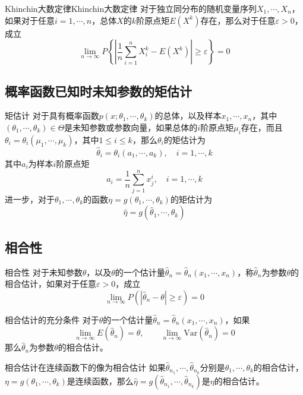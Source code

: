 \documentclass[lang = cn, scheme = chinese, thmcnt = section]{elegantbook}
\begin{document}
\begin{theorem}{Khinchin大数定律}{Khinchin大数定律}
	对于独立同分布的随机变量序列$X_1,\cdots,X_n$，如果对于任意$i=1,\cdots,n$，总体$X$的$k$阶原点矩$E(X^k)$存在，那么对于任意$\varepsilon>0$，成立
	$$
	\lim_{n\to\infty}P\left\{ \left| \frac{1}{n}\sum_{i=1}^{n}{X_i^k}-E(X^k) \right|\ge\varepsilon \right\}=0
	$$
\end{theorem}

\subsection{概率函数已知时未知参数的矩估计}

\begin{definition}{矩估计}
	对于具有概率函数$p(x;\theta_1,\cdots,\theta_k)$的总体，以及样本$x_1,\cdots,x_n$，其中$(\theta_1,\cdots,\theta_k)\in\Theta$是未知参数或参数向量，如果总体的$i$阶原点矩$\mu_i$存在，而且$\theta_i=\theta_i(\mu_1,\cdots,\mu_k)$，其中$1\le i\le k$，那么$\theta_i$的矩估计为
	$$
	\hat{\theta}_i=\theta_i(a_1,\cdots,a_k),\quad i=1,\cdots,k
	$$
	其中$a_i$为样本$i$阶原点矩
	$$
	a_i=\frac{1}{n}\sum_{j=1}^{n}{x_j^i},\quad i=1,\cdots,k
	$$
	进一步，对于$\theta_1,\cdots,\theta_k$的函数$\eta=g(\theta_1,\cdots,\theta_k)$的矩估计为
	$$
	\hat{\eta}=g(\hat{\theta}_1,\cdots,\hat{\theta}_k)
	$$
\end{definition}

\subsection{相合性}

\begin{definition}{相合性}
	对于未知参数$\theta$，以及$\theta$的一个估计量$\hat{\theta}_n=\hat{\theta}_n(x_1,\cdots,x_n)$，称$\hat{\theta}_n$为参数$\theta$的相合估计，如果对于任意$\varepsilon>0$，成立
	$$
	\lim_{n\to\infty}{P\left( \left|\hat{\theta}_n-\theta\right|\ge\varepsilon \right)}=0
	$$
\end{definition}

\begin{theorem}{相合估计的充分条件}
	对于$\theta$的一个估计量$\hat{\theta}_n=\hat{\theta}_n(x_1,\cdots,x_n)$，如果
	$$
	\lim_{n\to\infty}{E( \hat{\theta}_n)}=\theta,\qquad
	\lim_{n\to\infty}{\mathrm{Var}( \hat{\theta}_n)}=0
	$$
	那么$\hat{\theta}_n$为参数$\theta$的相合估计。
\end{theorem}

\begin{theorem}{相合估计在连续函数下的像为相合估计}
	如果$\hat{\theta}_{n_1},\cdots,\hat{\theta}_{n_k}$分别是$\theta_1,\cdots,\theta_k$的相合估计，$\eta=g(\theta_1,\cdots,\theta_k)$是连续函数，那么$\hat{\eta}=g(\hat{\theta}_{n_1},\cdots,\hat{\theta}_{n_k})$是$\eta$的相合估计。
\end{theorem}
\end{document}
